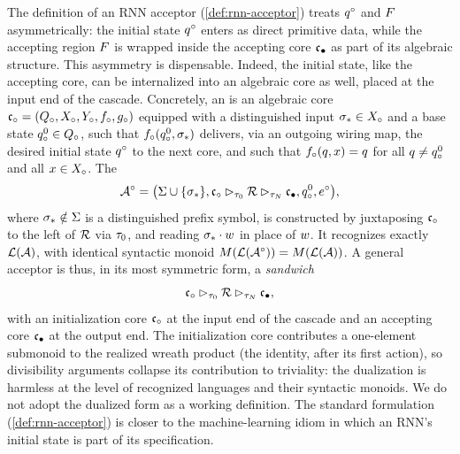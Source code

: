 \documentclass{article}
\begin{document}
\begin{remark}\label{rem:sandwich}
The definition of an RNN acceptor (\cref{def:rnn-acceptor}) treats $q^{\circ}$ and $F$ asymmetrically: the initial state $q^{\circ}$ enters as direct primitive data, while the accepting region $F$ is wrapped inside the accepting core ${\mathfrak{c}_{\bullet}}$ as part of its algebraic structure. 
This asymmetry is dispensable. Indeed, the initial state, like the accepting core, can be internalized into an algebraic core as well, placed at the input end of the cascade. 
Concretely, an  is an algebraic core ${\mathfrak{c}_{\circ}} = (Q_\circ, X_\circ, Y_\circ, f_\circ, g_\circ)$ equipped with a distinguished input $\sigma_* \in X_\circ$ and a base state $q_\circ^0 \in Q_\circ$, such that $f_\circ(q_\circ^0, \sigma_*)$ delivers, via an outgoing wiring map, the desired initial state $q^{\circ}$ to the next core, and such that $f_\circ(q, x) = q$ for all $q \neq q_\circ^0$ and all $x \in X_\circ$. 
The  
$$
\mathcal{A}^\circ = \bigl(\Sigma \cup \{\sigma_*\}, {\mathfrak{c}_{\circ}} \mathbin{\rhd_{\tau_0}} \mathcal{R} \mathbin{\rhd_{\tau_N}} {\mathfrak{c}_{\bullet}}, q_\circ^0, e^\circ\bigr),
$$
where $\sigma_* \notin \Sigma$ is a distinguished prefix symbol, is constructed by juxtaposing ${\mathfrak{c}_{\circ}}$ to the left of $\mathcal{R}$ via $\tau_0$, and reading $\sigma_* \cdot w$ in place of $w$. 
It recognizes exactly $\mathcal{L}(\mathcal{A})$, with identical syntactic monoid $M(\mathcal{L}(\mathcal{A}^\circ)) = M(\mathcal{L}(\mathcal{A}))$. 
A general acceptor is thus, in its most symmetric form, a \emph{sandwich}
$$
{\mathfrak{c}_{\circ}} \mathbin{\rhd_{\tau_0}} \mathcal{R} \mathbin{\rhd_{\tau_N}} {\mathfrak{c}_{\bullet}},
$$
with an initialization core ${\mathfrak{c}_{\circ}}$ at the input end of the cascade and an accepting core ${\mathfrak{c}_{\bullet}}$ at the output end. 
The initialization core contributes a one-element submonoid to the realized wreath product (the identity, after its first action), so divisibility arguments collapse its contribution to triviality: the dualization is harmless at the level of recognized languages and their syntactic monoids. 
We do not adopt the dualized form as a working definition. 
The standard formulation (\cref{def:rnn-acceptor}) is closer to the machine-learning idiom in which an RNN's initial state is part of its specification. 
\end{remark}
\end{document}
